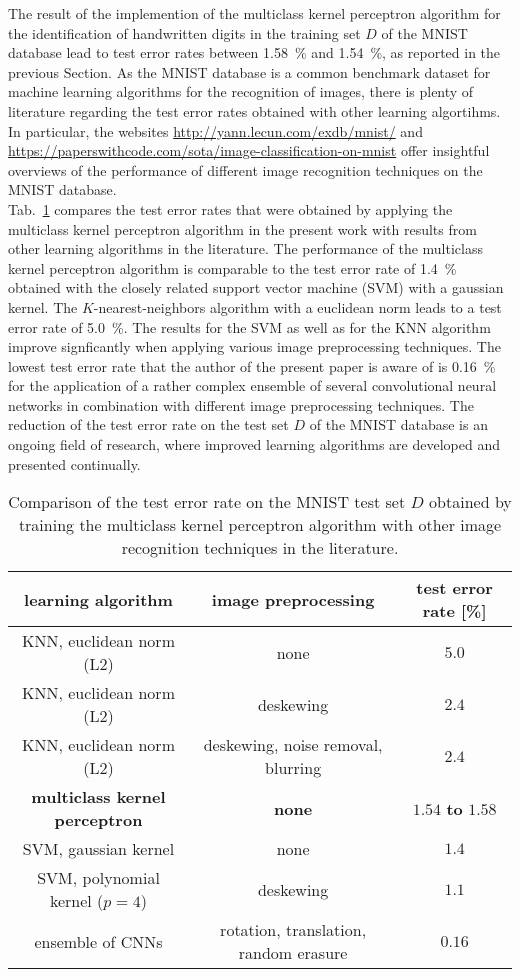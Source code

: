 The result of the implemention of the multiclass kernel perceptron algorithm for the identification of handwritten digits in the training set $D$ of the MNIST database lead to test error rates between \SI{1.58}{\percent} and \SI{1.54}{\percent}, as reported in the previous Section. As the MNIST database is a common benchmark dataset for machine learning algorithms for the recognition of images, there is plenty of literature regarding the test error rates obtained with other learning algortihms. In particular, the websites \url{http://yann.lecun.com/exdb/mnist/} and \url{https://paperswithcode.com/sota/image-classification-on-mnist} offer insightful overviews of the performance of different image recognition techniques on the MNIST database. \\

Tab.~\ref{tab:comparison} compares the test error rates that were obtained by applying the multiclass kernel perceptron algorithm in the present work with results from other learning algorithms in the literature. The performance of the multiclass kernel perceptron algorithm is comparable to the test error rate of \SI{1.4}{\percent} obtained with the closely related support vector machine (SVM) with a gaussian kernel. The $K$-nearest-neighbors algorithm with a euclidean norm leads to a test error rate of \SI{5.0}{\percent}. The results for the SVM as well as for the KNN algorithm improve signficantly when applying various image preprocessing techniques. The lowest test error rate that the author of the present paper is aware of is \SI{0.16}{\percent} for the application of a rather complex ensemble of several convolutional neural networks in combination with different image preprocessing techniques. The reduction of the test error rate on the test set $D$ of the MNIST database is an ongoing field of research, where improved learning algorithms are developed and presented continually.\\

\begin{table}
\centering
\begin{tabular}{c|c|c}
learning algorithm & image preprocessing & test error rate [\%]\\
\hline
\hline
KNN, euclidean norm (L2) & none & $5.0$\\
KNN, euclidean norm (L2) & deskewing & $2.4$\\
KNN, euclidean norm (L2) & deskewing, noise removal, blurring & $2.4$\\
\textbf{multiclass kernel perceptron} & \textbf{none} & \boldmath$1.54$ \textbf{to} \boldmath$1.58$\\ 
SVM, gaussian kernel & none & $1.4$\\
SVM, polynomial kernel ($p=4$) & deskewing & $1.1$\\
ensemble of CNNs & rotation, translation, random erasure & $0.16$
\end{tabular}
\caption{Comparison of the test error rate on the MNIST test set $D$ obtained by training the multiclass kernel perceptron algorithm with other image recognition techniques in the literature.}
\label{tab:comparison}
\end{table}

